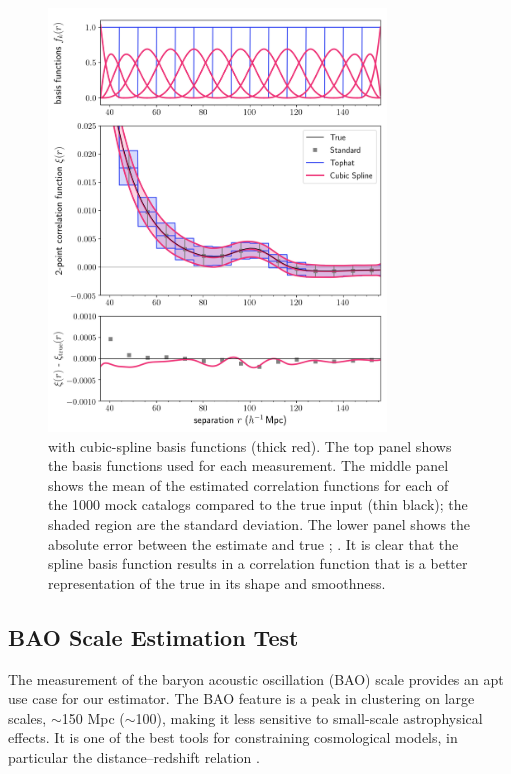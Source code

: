 \begin{figure}%
    \centering
        \includegraphics[width=0.8\textwidth]{xicomparison_2e-4_tophat8_spline}
        \caption{ \est with cubic-spline basis functions (thick red).  The top panel shows the basis functions used for each measurement. The middle panel shows the mean of the estimated correlation functions for each of the 1000 mock catalogs compared to the true input \cf (thin black); the shaded region  are the standard deviation. The lower panel shows the absolute error between the estimate and true \cf; . It is clear that the spline basis function results in a correlation function that is a better representation of the true \cf in its shape and smoothness.}
        \label{fig:spline}
    \end{figure}    

\subsection{BAO Scale Estimation Test}
\label{sec:bao}

The measurement of the baryon acoustic oscillation (BAO) scale provides an apt use case for our estimator.
The BAO feature is a peak in clustering on large scales, $\sim$150 Mpc ($\sim$100\hmpc), making it less sensitive to small-scale astrophysical effects.
It is one of the best tools for constraining cosmological models, in particular the distance--redshift relation \citep{Cole2005, Eisenstein2005, Kazin2010, Anderson2012, Anderson2014, Alam2017}.

